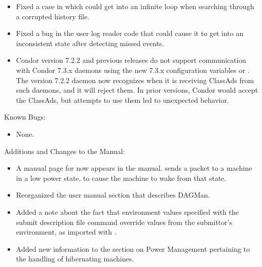 \begin{itemize}
\item Fixed a case in which  could get into an infinite
loop when searching through a corrupted history file.

\item Fixed a bug in the user log reader code that could cause it to
  get into an inconsistent state after detecting missed events.

\item Condor version 7.2.2 and previous releases do not support 
  communication with Condor 7.3.x daemons using the new 7.3.x
  configuration variables  or
  .
  The version 7.2.2  daemon now
  recognizes when it is receiving ClassAds from such daemons,
  and it will reject them.
  In prior versions, Condor would accept the ClassAds,
  but attempts to use them led to unexpected behavior.

\end{itemize}

\noindent Known Bugs:

\begin{itemize}

\item None.

\end{itemize}

\noindent Additions and Changes to the Manual:

\begin{itemize}

\item A manual page for  now appears in the manual.
 sends a packet to a machine in a low power state,
to cause the machine to wake from that state.

\item Reorganized the user manual section that describes DAGMan.

\item Added a note about the fact that environment values specified
with the  submit description file command override values from
the submittor's environment, as imported with .

\item Added new information to the section on Power Management
  pertaining to the handling of hibernating machines.
  

\end{itemize}


